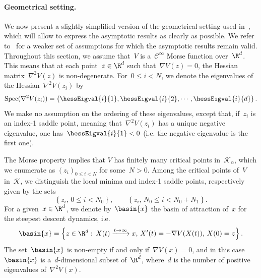     \paragraph{Geometrical setting.}
        We now present a slightly simplified version of the geometrical setting used in~\cite{BLS25a}, which will allow to express the asymptotic results as clearly as possible. We refer to~\cite{BLS25a} for a weaker set of assumptions for which the asymptotic results remain valid.
        Throughout this section, we assume that~$V$ is a~$\mathcal C^\infty$ Morse function over~$\R^d$. This means that at each point~$z\in \R^d$ such that~$\nabla V(z)=0$, the Hessian matrix~$\nabla^2 V(z)$ is non-degenerate.
        For~$0\leq i < N$, we denote the eigenvalues of the Hessian~$\nabla^2 V(z_i)$ by
        \begin{equation}
            \label{03:eq:eigvals_hessian}
            \mathrm{Spec}(\nabla^2 V(z_i)) = \left\{\hessEigval{i}{1}, \hessEigval{i}{2}, \dotsm, \hessEigval{i}{d}\right\}.
        \end{equation}
        We make no assumption on the ordering of these eigenvalues, except that, if~$z_i$ is an index-1 saddle point, meaning that~$\nabla^2 V(z_i)$ has a unique negative eigenvalue, one has~$\hessEigval{i}{1}<0$ (i.e. the negative eigenvalue is the first one).
        
        The Morse property implies that $V$ has finitely many critical points in~$\mathcal K_\alpha$, which we enumerate as
        $(z_i)_{0\leq i < N}$ for some~$N>0$.
        Among the critical points of~$V$ in~$\mathcal K$, we distinguish the local minima and index-1 saddle points, respectively given by the sets
        \begin{equation}
            \label{03:eq:minima_saddles}
            \left\{z_i,\,0\leq i < N_0\right\},\qquad \left\{z_i,\,N_0\leq i<N_0+N_1\right\}.
        \end{equation}
        For a given~$x\in\R^d$, we denote by~$\basin{x}$ the basin of attraction of~$x$ for the steepest descent dynamics, i.e.
        \begin{equation}
            \label{03:eq:basin}
            \basin{x} = \left\{z\in\R^d:\,X(t)\xrightarrow{t\to\infty} x,\,X'(t)=-\nabla V(X(t)),\,X(0)=z\right\}.
        \end{equation}
        The set~$\basin{x}$ is non-empty if and only if~$\nabla V(x)=0$, and in this case~$\basin{x}$ is a~$d$-dimensional subset of~$\R^d$, where~$d$ is the number of positive eigenvalues of~$\nabla^2 V(x)$.

